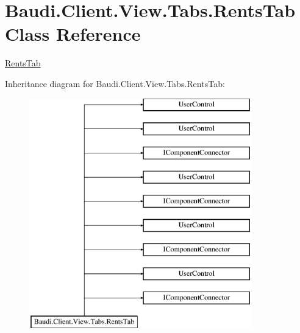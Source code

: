 \hypertarget{class_baudi_1_1_client_1_1_view_1_1_tabs_1_1_rents_tab}{}\section{Baudi.\+Client.\+View.\+Tabs.\+Rents\+Tab Class Reference}
\label{class_baudi_1_1_client_1_1_view_1_1_tabs_1_1_rents_tab}


\hyperlink{class_baudi_1_1_client_1_1_view_1_1_tabs_1_1_rents_tab}{Rents\+Tab}  


Inheritance diagram for Baudi.\+Client.\+View.\+Tabs.\+Rents\+Tab\+:\begin{figure}[H]
\begin{center}
\leavevmode
\includegraphics[height=10.000000cm]{class_baudi_1_1_client_1_1_view_1_1_tabs_1_1_rents_tab}
\end{center}
\end{figure}
